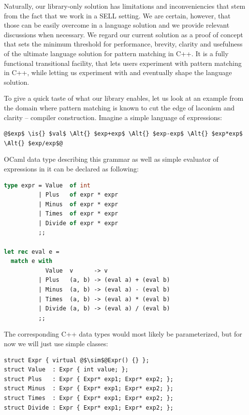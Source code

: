 \documentclass[preprint]{sigplanconf}
\newcommand{\Alt}{\ensuremath{|}}
\newcommand{\is}{$::=$}
\begin{document}
Naturally, our library-only solution has limitations and inconveniencies that 
stem from the fact that we work in a SELL setting. We are certain, however, that 
those can be easily overcome in a language solution and we provide relevant 
discussions when necessary. We regard our current solution as a proof of  
concept that sets the minimum threshold for performance, brevity, clarity and 
usefulness of the ultimate language solution for pattern matching in C++. It is 
a fully functional transitional facility, that lets users experiment with 
pattern matching in C++, while letting us experiment with and eventually shape 
the language solution.

To give a quick taste of what our library enables, let us look at an example from 
the domain where pattern matching is known to cut the edge of laconism and 
clarity -- compiler construction. Imagine a simple language of expressions:

\begin{lstlisting}
@$exp$ \is{} $val$ \Alt{} $exp+exp$ \Alt{} $exp-exp$ \Alt{} $exp*exp$ \Alt{} $exp/exp$@
\end{lstlisting}

OCaml data type describing this grammar as well as simple evaluator of expressions 
in it can be declared as following:

\begin{lstlisting}[language=Caml,keepspaces,columns=flexible]
type expr = Value  of int
          | Plus   of expr * expr
          | Minus  of expr * expr
          | Times  of expr * expr
          | Divide of expr * expr
          ;;

let rec eval e =
  match e with
            Value  v      -> v
          | Plus   (a, b) -> (eval a) + (eval b)
          | Minus  (a, b) -> (eval a) - (eval b)
          | Times  (a, b) -> (eval a) * (eval b)
          | Divide (a, b) -> (eval a) / (eval b)
          ;;
\end{lstlisting}

The corresponding C++ data types would most likely be parameterized, but for
now we will just use simple classes:

\begin{lstlisting}[keepspaces,columns=flexible]
struct Expr { virtual @$\sim$@Expr() {} };
struct Value  : Expr { int value; };
struct Plus   : Expr { Expr* exp1; Expr* exp2; };
struct Minus  : Expr { Expr* exp1; Expr* exp2; };
struct Times  : Expr { Expr* exp1; Expr* exp2; };
struct Divide : Expr { Expr* exp1; Expr* exp2; };
\end{lstlisting}
\end{document}
